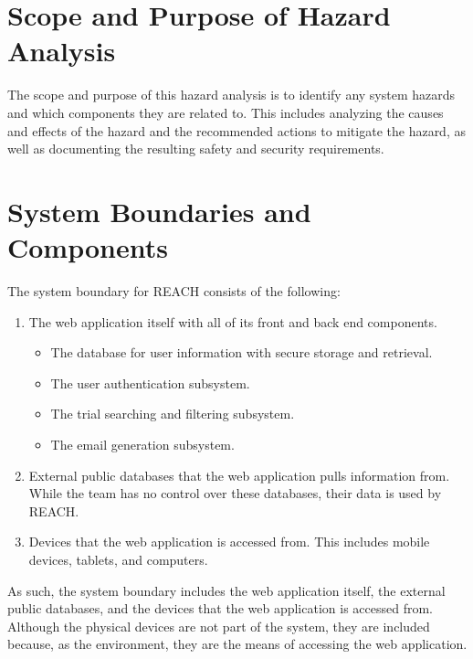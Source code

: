 \documentclass{article}
\begin{document}
\section{Scope and Purpose of Hazard Analysis}
The scope and purpose of this hazard analysis is to identify any system hazards and which components they are related to. This
includes analyzing the causes and effects of the hazard and the recommended actions to mitigate the hazard, as well as documenting
the resulting safety and security requirements.

\section{System Boundaries and Components}
The system boundary for REACH consists of the following:
\begin{enumerate}
  \item The web application itself with all of its front and back end components.
        \begin{itemize}
          \item The database for user information with secure storage and retrieval.
          \item The user authentication subsystem.
          \item The trial searching and filtering subsystem.
          \item The email generation subsystem.
        \end{itemize}
  \item External public databases that the web application pulls information from.
        While the team has no control over these databases, their data is used by REACH.
  \item Devices that the web application is accessed from.
        This includes mobile devices, tablets, and computers.
\end{enumerate}

As such, the system boundary
includes the web application itself, the external public databases,
and the devices that the web application is accessed from.
Although the physical devices are not part of the system,
they are included because, as the environment, they are the means of accessing the web application.

\end{document}
